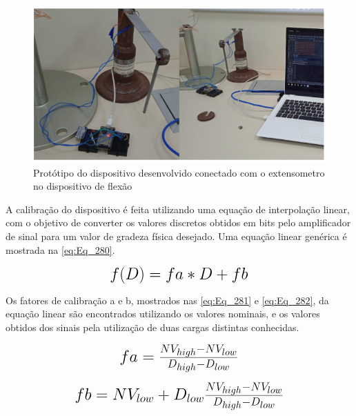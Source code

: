 \begin{figure}[htb]
	\caption{\label{fig:2070} Protótipo do dispositivo desenvolvido conectado com o extensometro no dispositivo de flexão}
	\begin{center}
		\includegraphics[width=\textwidth]{pictures/2070.png}
	\end{center}
\end{figure}

A calibração do dispositivo é feita utilizando uma equação de interpolação linear, com o objetivo de converter os  valores discretos obtidos em bits pelo amplificador
de sinal para um valor de gradeza física desejado.
Uma equação linear genérica é mostrada na \autoref{eq:Eq_280}.

\begin{equation}\label{eq:Eq_280}%
\mbox{\fontsize{17.28}{21.6}\selectfont\( %
f(D) = fa * D + fb
\)} %
\end{equation}

Os fatores de calibração a e b, mostrados nas \autoref{eq:Eq_281} e \autoref{eq:Eq_282}, da equação linear são encontrados utilizando os valores nominais, e os valores obtidos
dos sinais pela utilização de duas cargas distintas conhecidas.

\begin{equation}\label{eq:Eq_281}%
\mbox{\fontsize{17.28}{21.6}\selectfont\( %
fa = \frac{NV_{high} - NV_{low}}{D_{high} - D_{low}}
\)} %
\end{equation}

\begin{equation}\label{eq:Eq_282}%
\mbox{\fontsize{17.28}{21.6}\selectfont\( %
fb = NV_{low} + D_{low} \frac{NV_{high} - NV_{low}}{D_{high} - D_{low}}
\)} %
\end{equation}

%
%
%
%
%
%

